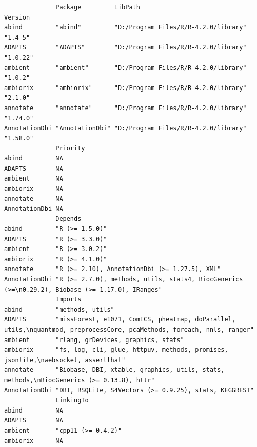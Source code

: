 \documentclass[
  letterpaper,
  DIV=11,
  numbers=noendperiod]{scrreprt}
\begin{document}
\begin{verbatim}
              Package         LibPath                              Version 
abind         "abind"         "D:/Program Files/R/R-4.2.0/library" "1.4-5" 
ADAPTS        "ADAPTS"        "D:/Program Files/R/R-4.2.0/library" "1.0.22"
ambient       "ambient"       "D:/Program Files/R/R-4.2.0/library" "1.0.2" 
ambiorix      "ambiorix"      "D:/Program Files/R/R-4.2.0/library" "2.1.0" 
annotate      "annotate"      "D:/Program Files/R/R-4.2.0/library" "1.74.0"
AnnotationDbi "AnnotationDbi" "D:/Program Files/R/R-4.2.0/library" "1.58.0"
              Priority
abind         NA      
ADAPTS        NA      
ambient       NA      
ambiorix      NA      
annotate      NA      
AnnotationDbi NA      
              Depends                                                                                        
abind         "R (>= 1.5.0)"                                                                                 
ADAPTS        "R (>= 3.3.0)"                                                                                 
ambient       "R (>= 3.0.2)"                                                                                 
ambiorix      "R (>= 4.1.0)"                                                                                 
annotate      "R (>= 2.10), AnnotationDbi (>= 1.27.5), XML"                                                  
AnnotationDbi "R (>= 2.7.0), methods, utils, stats4, BiocGenerics (>=\n0.29.2), Biobase (>= 1.17.0), IRanges"
              Imports                                                                                                               
abind         "methods, utils"                                                                                                      
ADAPTS        "missForest, e1071, ComICS, pheatmap, doParallel, utils,\nquantmod, preprocessCore, pcaMethods, foreach, nnls, ranger"
ambient       "rlang, grDevices, graphics, stats"                                                                                   
ambiorix      "fs, log, cli, glue, httpuv, methods, promises, jsonlite,\nwebsocket, assertthat"                                     
annotate      "Biobase, DBI, xtable, graphics, utils, stats, methods,\nBiocGenerics (>= 0.13.8), httr"                              
AnnotationDbi "DBI, RSQLite, S4Vectors (>= 0.9.25), stats, KEGGREST"                                                                
              LinkingTo         
abind         NA                
ADAPTS        NA                
ambient       "cpp11 (>= 0.4.2)"
ambiorix      NA                

\end{verbatim}
\end{document}

